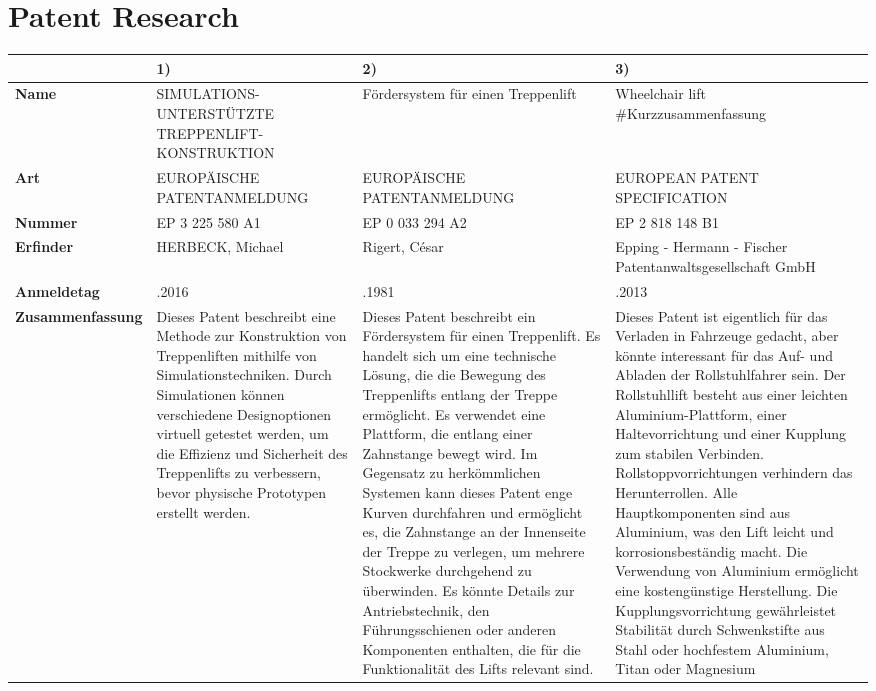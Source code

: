\documentclass[10pt,a4paper]{article}
\begin{document}
\section{Patent Research}
\begin{table}[h!]
    \centering
    \small %
    \begin{adjustbox}{max width=\textwidth}
    \begin{tabular}{>{\raggedright\arraybackslash}m{3cm} >{\raggedright\arraybackslash}m{3.5cm} >{\raggedright\arraybackslash}m{3.5cm} >{\raggedright\arraybackslash}m{3.5cm}}
        \toprule
        & \textbf{1)} & \textbf{2)} & \textbf{3)} \\
        \midrule
        \textbf{Name} & SIMULATIONS-UNTERSTÜTZTE TREPPENLIFT-KONSTRUKTION & Fördersystem für einen Treppenlift & Wheelchair lift \#Kurzzusammenfassung \\
        \textbf{Art} & EUROPÄISCHE PATENTANMELDUNG & EUROPÄISCHE PATENTANMELDUNG & EUROPEAN PATENT SPECIFICATION \\
        \textbf{Nummer} & EP 3 225 580 A1 & EP 0 033 294 A2 & EP 2 818 148 B1 \\
        \textbf{Erfinder} & HERBECK, Michael & Rigert, César & Epping - Hermann - Fischer Patentanwaltsgesellschaft GmbH \\
        \textbf{Anmeldetag} & 30.03.2016 & 09.01.1981 & 24.06.2013 \\
        \textbf{Zusammenfassung} & Dieses Patent beschreibt eine Methode zur Konstruktion von Treppenliften mithilfe von Simulationstechniken. Durch Simulationen können verschiedene Designoptionen virtuell getestet werden, um die Effizienz und Sicherheit des Treppenlifts zu verbessern, bevor physische Prototypen erstellt werden. & Dieses Patent beschreibt ein Fördersystem für einen Treppenlift. Es handelt sich um eine technische Lösung, die die Bewegung des Treppenlifts entlang der Treppe ermöglicht. Es verwendet eine Plattform, die entlang einer Zahnstange bewegt wird. Im Gegensatz zu herkömmlichen Systemen kann dieses Patent enge Kurven durchfahren und ermöglicht es, die Zahnstange an der Innenseite der Treppe zu verlegen, um mehrere Stockwerke durchgehend zu überwinden. Es könnte Details zur Antriebstechnik, den Führungsschienen oder anderen Komponenten enthalten, die für die Funktionalität des Lifts relevant sind. & Dieses Patent ist eigentlich für das Verladen in Fahrzeuge gedacht, aber könnte interessant für das Auf- und Abladen der Rollstuhlfahrer sein. Der Rollstuhllift besteht aus einer leichten Aluminium-Plattform, einer Haltevorrichtung und einer Kupplung zum stabilen Verbinden. Rollstoppvorrichtungen verhindern das Herunterrollen. Alle Hauptkomponenten sind aus Aluminium, was den Lift leicht und korrosionsbeständig macht. Die Verwendung von Aluminium ermöglicht eine kostengünstige Herstellung. Die Kupplungsvorrichtung gewährleistet Stabilität durch Schwenkstifte aus Stahl oder hochfestem Aluminium, Titan oder Magnesium \\

\end{tabular}
\end{adjustbox}
\end{table}
\end{document}
